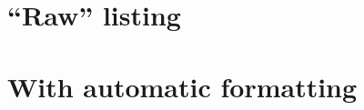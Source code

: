 \documentclass{article}%
\begin{document}
\section*{``Raw'' listing}


\section*{With automatic formatting}

\end{document}
